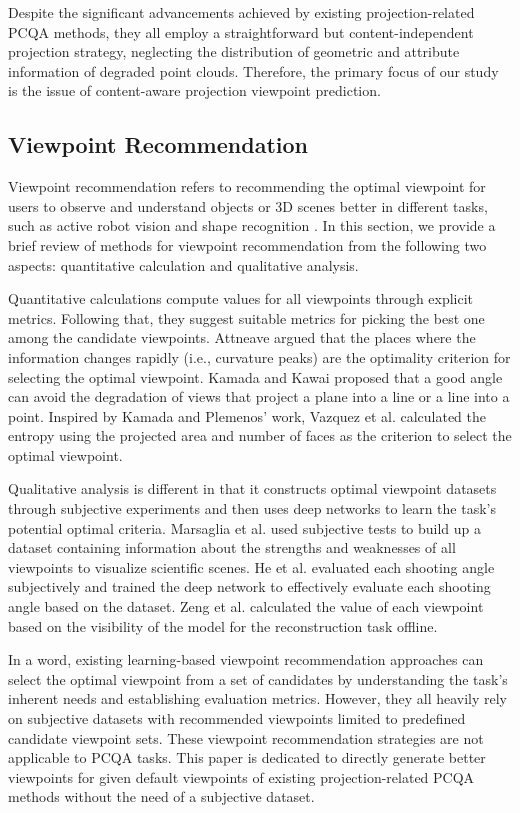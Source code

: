 Despite the significant advancements achieved by existing projection-related PCQA methods, they all employ a straightforward but content-independent projection strategy, neglecting the distribution of geometric and attribute information of degraded point clouds. 
Therefore, the primary focus of our study is the issue of content-aware projection viewpoint prediction. 

\subsection{Viewpoint Recommendation}

Viewpoint recommendation refers to recommending the optimal viewpoint for users to observe and understand objects or 3D scenes better in different tasks, such as active robot vision \cite{Zengr20cvm} and shape recognition \cite{AbdullahH21}. 
In this section, we provide a brief review of methods for viewpoint recommendation from the following two aspects: quantitative calculation and qualitative analysis.

Quantitative calculations compute values for all viewpoints through explicit metrics.
Following that, they suggest suitable metrics for picking the best one among the candidate viewpoints.
Attneave \cite{attneave1954-visualpercept} argued that the places where the information changes rapidly (i.e., curvature peaks) are the optimality criterion for selecting the optimal viewpoint.
Kamada and Kawai \cite{17Kamada} proposed that a good angle can avoid the degradation of views that project a plane into a line or a line into a point.
Inspired by Kamada and Plemenos' work, Vazquez et al. \cite{20zquez} calculated the entropy using the projected area and number of faces as the criterion to select the optimal viewpoint.

Qualitative analysis is different in that it constructs optimal viewpoint datasets through subjective experiments and then uses deep networks to learn the task's potential optimal criteria.
Marsaglia et al. \cite{24Marsaglia} used subjective tests to build up a dataset containing information about the strengths and weaknesses of all viewpoints to visualize scientific scenes.
He et al. \cite{photo2018He} evaluated each shooting angle subjectively and trained the deep network to effectively evaluate each shooting angle based on the dataset.
Zeng et al. \cite{2020PCNBV} calculated the value of each viewpoint based on the visibility of the model for the reconstruction task offline.
                 
In a word, existing learning-based viewpoint recommendation approaches can select the optimal viewpoint from a set of candidates by understanding the task's inherent needs and establishing evaluation metrics.
However, they all heavily rely on subjective datasets with recommended viewpoints limited to predefined candidate viewpoint sets. These viewpoint recommendation strategies are not applicable to PCQA tasks.
This paper is dedicated to directly generate better viewpoints for given default viewpoints of existing projection-related PCQA methods without the need of a subjective dataset.
